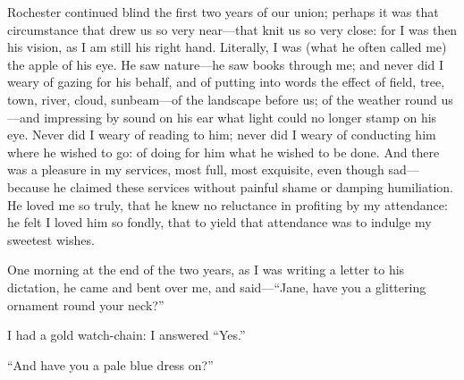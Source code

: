 \Mr{} Rochester continued blind the first two years of our union; perhaps
it was that circumstance that drew us so very near---that knit us so
very close: for I was then his vision, as I am still his right hand. 
Literally, I was (what he often called me) the apple of his eye. He saw
nature---he saw books through me; and never did I weary of gazing for
his behalf, and of putting into words the effect of field, tree, town,
river, cloud, sunbeam---of the landscape before us; of the weather round
us---and impressing by sound on his ear what light could no longer stamp
on his eye. Never did I weary of reading to him; never did I weary of
conducting him where he wished to go: of doing for him what he wished to
be done. And there was a pleasure in my services, most full, most
exquisite, even though sad---because he claimed these services without
painful shame or damping humiliation. He loved me so truly, that he
knew no reluctance in profiting by my attendance: he felt I loved him so
fondly, that to yield that attendance was to indulge my sweetest wishes.

One morning at the end of the two years, as I was writing a letter to
his dictation, he came and bent over me, and said---\enquote{Jane, have
you a glittering ornament round your neck?}

I had a gold watch-chain: I answered \enquote{Yes.}

\enquote{And have you a pale blue dress on?}

